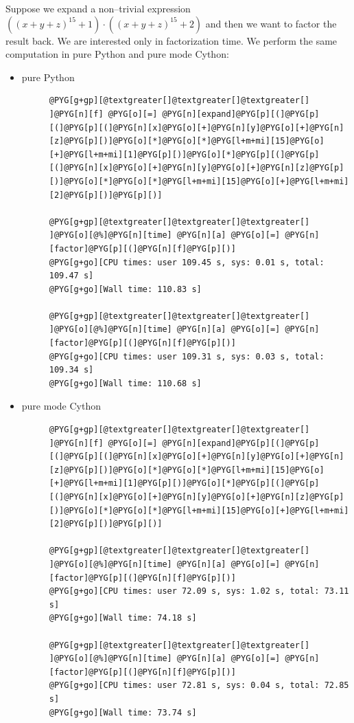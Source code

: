 Suppose we expand a non--trivial expression $((x + y + z)^15 + 1) \cdot ((x + y + z)^15 + 2)$ and
then we want to factor the result back. We are interested only in factorization time. We perform
the same computation in pure Python and pure mode Cython:
\begin{itemize}
\item {} \begin{description}
\item[pure Python] \leavevmode
\begin{Verbatim}[commandchars=@\[\]]
@PYG[g+gp][@textgreater[]@textgreater[]@textgreater[] ]@PYG[n][f] @PYG[o][=] @PYG[n][expand]@PYG[p][(]@PYG[p][(]@PYG[p][(]@PYG[n][x]@PYG[o][+]@PYG[n][y]@PYG[o][+]@PYG[n][z]@PYG[p][)]@PYG[o][*]@PYG[o][*]@PYG[l+m+mi][15]@PYG[o][+]@PYG[l+m+mi][1]@PYG[p][)]@PYG[o][*]@PYG[p][(]@PYG[p][(]@PYG[n][x]@PYG[o][+]@PYG[n][y]@PYG[o][+]@PYG[n][z]@PYG[p][)]@PYG[o][*]@PYG[o][*]@PYG[l+m+mi][15]@PYG[o][+]@PYG[l+m+mi][2]@PYG[p][)]@PYG[p][)]

@PYG[g+gp][@textgreater[]@textgreater[]@textgreater[] ]@PYG[o][@%]@PYG[n][time] @PYG[n][a] @PYG[o][=] @PYG[n][factor]@PYG[p][(]@PYG[n][f]@PYG[p][)]
@PYG[g+go][CPU times: user 109.45 s, sys: 0.01 s, total: 109.47 s]
@PYG[g+go][Wall time: 110.83 s]

@PYG[g+gp][@textgreater[]@textgreater[]@textgreater[] ]@PYG[o][@%]@PYG[n][time] @PYG[n][a] @PYG[o][=] @PYG[n][factor]@PYG[p][(]@PYG[n][f]@PYG[p][)]
@PYG[g+go][CPU times: user 109.31 s, sys: 0.03 s, total: 109.34 s]
@PYG[g+go][Wall time: 110.68 s]
\end{Verbatim}
\noindent
\end{description}

\item {} \begin{description}
\item[pure mode Cython] \leavevmode
\begin{Verbatim}[commandchars=@\[\]]
@PYG[g+gp][@textgreater[]@textgreater[]@textgreater[] ]@PYG[n][f] @PYG[o][=] @PYG[n][expand]@PYG[p][(]@PYG[p][(]@PYG[p][(]@PYG[n][x]@PYG[o][+]@PYG[n][y]@PYG[o][+]@PYG[n][z]@PYG[p][)]@PYG[o][*]@PYG[o][*]@PYG[l+m+mi][15]@PYG[o][+]@PYG[l+m+mi][1]@PYG[p][)]@PYG[o][*]@PYG[p][(]@PYG[p][(]@PYG[n][x]@PYG[o][+]@PYG[n][y]@PYG[o][+]@PYG[n][z]@PYG[p][)]@PYG[o][*]@PYG[o][*]@PYG[l+m+mi][15]@PYG[o][+]@PYG[l+m+mi][2]@PYG[p][)]@PYG[p][)]

@PYG[g+gp][@textgreater[]@textgreater[]@textgreater[] ]@PYG[o][@%]@PYG[n][time] @PYG[n][a] @PYG[o][=] @PYG[n][factor]@PYG[p][(]@PYG[n][f]@PYG[p][)]
@PYG[g+go][CPU times: user 72.09 s, sys: 1.02 s, total: 73.11 s]
@PYG[g+go][Wall time: 74.18 s]

@PYG[g+gp][@textgreater[]@textgreater[]@textgreater[] ]@PYG[o][@%]@PYG[n][time] @PYG[n][a] @PYG[o][=] @PYG[n][factor]@PYG[p][(]@PYG[n][f]@PYG[p][)]
@PYG[g+go][CPU times: user 72.81 s, sys: 0.04 s, total: 72.85 s]
@PYG[g+go][Wall time: 73.74 s]
\end{Verbatim}
\noindent
\end{description}

\end{itemize}

